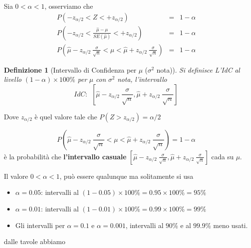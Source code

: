 \documentclass[
  11pt,
]{book}
\providecommand{\tightlist}{%
  \setlength{\itemsep}{0pt}\setlength{\parskip}{0pt}}
\theoremstyle{mytheoremstyle}
\theoremstyle{mydefstyle}
\newtheorem{definition}{Definizione}[section]
\begin{document}
Sia \(0<\alpha<1\), osserviamo che
\begin{eqnarray*}
  P(-z_{\alpha/2}<Z<+z_{\alpha/2}) &=& 1-\alpha \\
  P\left(-z_{\alpha/2}<\frac{\hat \mu -\mu}{SE(\hat \mu)}< +z_{\alpha/2}\right) &=& 1-\alpha \\
  P\left(\hat \mu- z_{\alpha/2}~\frac\sigma{\sqrt n}<\mu<\hat \mu+z_{\alpha/2}~\frac\sigma{\sqrt n}\right) &=& 1-\alpha
\end{eqnarray*}

\begin{info}

\begin{definition}[Intervallo di Confidenza per $\mu$ ($\sigma^2$ nota)]
Si definisce L'IdC al livello \((1-\alpha)\times100\%\) per \(\mu\) con \(\sigma^2\) nota, l'intervallo
\[IdC:~~\left[\hat \mu- z_{\alpha/2}~\frac\sigma{\sqrt n},\hat \mu+ z_{\alpha/2}~\frac\sigma{\sqrt n}\right]\]
\end{definition}

\end{info}

Dove \(z_{\alpha/2}\) è quel valore tale che \(P(Z>z_{\alpha/2})=\alpha/2\)

\[  P\left(\hat \mu- z_{\alpha/2}~\frac\sigma{\sqrt n}<\mu<\hat \mu+z_{\alpha/2}~\frac\sigma{\sqrt n}\right) = 1-\alpha\]
è la probabilità che \textbf{l'intervallo casuale}
\(\left[\hat \mu- z_{\alpha/2}~\frac\sigma{\sqrt n},\hat \mu+ z_{\alpha/2}~\frac\sigma{\sqrt n}\right]\)
cada su \(\mu\).

Il valore \(0<\alpha<1\), può essere qualunque ma solitamente si usa

\begin{itemize}
\tightlist
\item
  \(\alpha=0.05\): intervalli al \((1-0.05)\times 100\%=0.95\times 100\%=95\%\)
\item
  \(\alpha=0.01\): intervalli al \((1-0.01)\times 100\%=0.99\times 100\%=99\%\)
\item
  Gli intervalli per \(\alpha=0.1\) e \(\alpha=0.001\), intervalli al \(90\%\) e al \(99.9\%\) meno usati.
\end{itemize}

dalle tavole abbiamo
\end{document}
